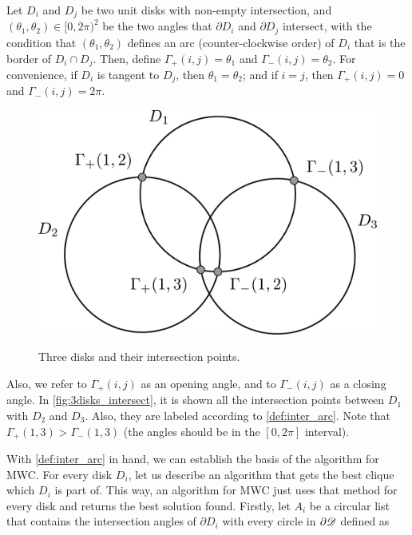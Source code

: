 \begin{definicao}\label{def:inter_arc}
    Let $D_i$ and $D_j$ be two unit disks with non-empty intersection, and $(\theta_1, \theta_2) \in [0,2\pi)^2$ be the two angles that $\partial D_i$ and $\partial D_j$ intersect, with the condition that $(\theta_1,\theta_2)$ defines an arc (counter-clockwise order) of $D_i$ that is the border of $D_i \cap D_j$. Then, define $\Gamma_+(i,j) = \theta_1$ and $\Gamma_-(i,j) = \theta_2$. For convenience, if $D_i$ is tangent to $D_j$, then $\theta_1=\theta_2$; and if $i=j$, then $\Gamma_+(i, j)=0$ and $\Gamma_-(i,j)=2\pi$.
\end{definicao}

\begin{figure}
\centering

    \caption{Three disks and their intersection points.}
    \includegraphics[scale=.36]{tex/figures/3_disks_intersect.pdf}
%    
    \fautor
    \label{fig:3disks_intersect}
\end{figure}

Also, we refer to $\Gamma_+(i,j)$ as an opening angle, and to $\Gamma_-(i,j)$ as a closing angle. In \autoref{fig:3disks_intersect}, it is shown all the intersection points between $D_1$ with $D_2$ and $D_3$. Also, they are labeled according to \autoref{def:inter_arc}. Note that $\Gamma_+(1,3) > \Gamma_-(1,3)$ (the angles should be in the $[0,2\pi]$ interval).

With \autoref{def:inter_arc} in hand, we can establish the basis of the algorithm for MWC. For every disk $D_i$, let us describe an algorithm that gets the best clique which $D_i$ is part of. This way, an algorithm for MWC just uses that method for every disk and returns the best solution found. Firstly, let $A_i$ be a circular list that contains the intersection angles of $\partial D_i$ with every circle in $\partial \mathscr{D}$ defined as

